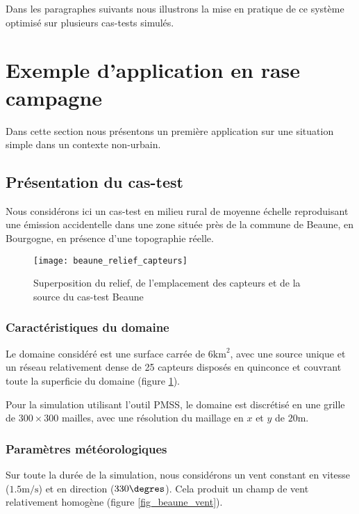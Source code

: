 Dans les paragraphes suivants nous illustrons la mise en pratique de ce système optimisé sur plusieurs cas-tests simulés. \\



\section{Exemple d'application en rase campagne}

Dans cette section nous présentons un première application sur une situation  simple dans un contexte non-urbain.

\subsection{Présentation du cas-test}

Nous considérons ici un cas-test en milieu rural de moyenne échelle reproduisant une émission accidentelle dans une zone située près de la commune de Beaune, en Bourgogne, en présence d'une topographie réelle. 

\begin{figure}[h!]
	\centering
	\texttt{[image: beaune\_relief\_capteurs]}
	\caption{Superposition du relief, de l'emplacement des capteurs et de la source du cas-test Beaune}
	\label{fig_beaune_relief}
\end{figure}

\subsubsection{Caractéristiques du domaine}
Le domaine considéré est une surface carrée de $6 \text{km}^2$, avec une source unique et un réseau relativement dense de 25 capteurs disposés en quinconce et couvrant toute la superficie du domaine (figure \ref{fig_beaune_relief}).

Pour la simulation utilisant l'outil PMSS, le domaine est discrétisé en une grille de $300 \times 300$ mailles, avec une résolution du maillage en $x$ et $y$ de $20\text{m}$. 

\subsubsection{Paramètres météorologiques}
Sur toute la durée de la simulation, nous considérons un vent constant en vitesse ($1.5\text{m/s}$) et en direction ($330\degres$). Cela produit un champ de vent relativement homogène (figure \ref{fig_beaune_vent}).

